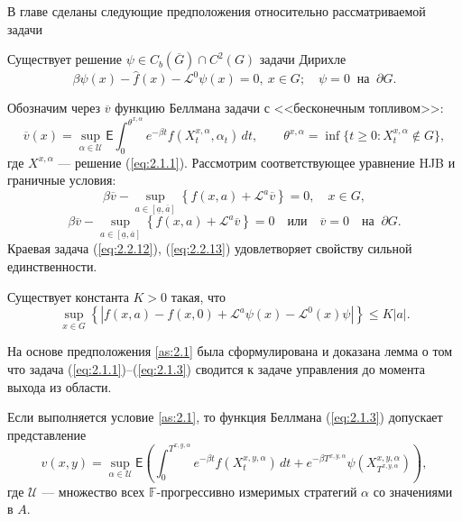 \documentclass[twoside,12pt]{article}
\begin{document}
В главе сделаны следующие предположения относительно рассматриваемой задачи
\begin{assumption} \label{as:2.1}
Существует решение $\psi\in C_b(\overline G)\cap C^2(G)$ задачи Дирихле
$$ \beta\psi(x)-\widehat f(x)-\mathcal L^0\psi (x)=0,  \ x\in G; \quad \psi=0 \ \textrm{ на }\ \partial G. $$
\end{assumption}

\begin{assumption} \label{as:2.2}
Обозначим через $\overline v$ функцию Беллмана задачи с <<бесконечным топливом>>:
$$ \overline v(x)=\sup_{\alpha\in\mathcal U} \mathsf E\int_0^{\theta^{x,\alpha}} e^{-\beta t} f(X_t^{x,\alpha},\alpha_t)\,dt,
\qquad \theta^{x,\alpha}=\inf\{t\ge 0: X_t^{x,\alpha}\not \in G\}, $$
где $X^{x,\alpha}$ --- решение (\ref{eq:2.1.1}). Рассмотрим соответствующее уравнение HJB и граничные условия:
\begin{equation} \label{eq:2.2.12}
\beta \overline v- \sup_{a \in [\underline a, \overline a]} \left\{f(x,a)+ \mathcal L^a \overline v \right\}=0,\quad x\in G,
\end{equation}
\begin{equation} \label{eq:2.2.13}
\beta \overline v- \sup_{a \in [\underline a, \overline a]} \left\{f(x,a)+ \mathcal L^a \overline v \right\}=0 \quad
\textrm{или}\quad \overline v=0\quad \textrm{на }\ \partial G.
\end{equation}
Краевая задача (\ref{eq:2.2.12}), (\ref{eq:2.2.13}) удовлетворяет свойству сильной единственности.
\end{assumption}
\begin{assumption} \label{as:2.3}
Существует константа $K>0$ такая, что
$$ \sup_{x\in G}\left\{|f(x,a)-f(x,0)+\mathcal L^a\psi(x)-\mathcal L^0(x)\psi|\right\}\le K|a|.$$
\end{assumption}
На основе предположения \ref{as:2.1} была сформулирована и доказана лемма о том что задача (\ref{eq:2.1.1})--(\ref{eq:2.1.3}) сводится к задаче управления до момента выхода из области.
\begin{lemma} \label{lem:2.1}
Если выполняется условие \ref{as:2.1}, то функция Беллмана (\ref{eq:2.1.3}) допускает представление
$$  v(x,y)=\sup_{\alpha\in\mathcal U}\mathsf E\left(\int_0^{T^{x,y,\alpha}} e^{-\beta t} f(X_t^{x,y,\alpha})\,dt+e^{-\beta T^{x,y,\alpha}}\psi(X_{T^{x,y,\alpha}}^{x,y,\alpha})\right), $$
где $\mathcal U$ --- множество всех $\mathbb F$-прогрессивно измеримых стратегий $\alpha$ со значениями в $A$.
\end{lemma}
\end{document}
